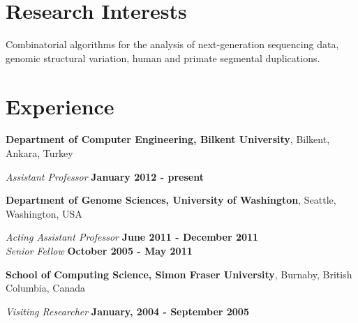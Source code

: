 \documentclass[margin,line]{res}
\newcommand{\junk}[1]{}
\begin{document}
\begin{resume}
  
  \section{\sc Research Interests}
  Combinatorial algorithms for the analysis of next-generation sequencing data, 
  genomic structural variation,  human and primate
  segmental duplications. %

          \section{\sc Experience}
                  {\bf Department of Computer Engineering, Bilkent University},
                  Bilkent, Ankara, Turkey
                  
                  \vspace{-.2cm}
                         {\em Assistant Professor} \hfill {\bf January 2012 - present} 
                         
                         
                         {\bf Department of Genome Sciences, University of Washington},
                         Seattle, Washington, USA
                         
                         \vspace{-.2cm}
                                {\em Acting Assistant Professor} \hfill {\bf June 2011 - December 2011} \\
                                
                                \vspace{-.2cm}
                                       {\em Senior Fellow} \hfill {\bf October 2005 - May 2011}
                                       
                          {\bf School of Computing Science, Simon Fraser University},
                          Burnaby, British Columbia, Canada

                          \vspace{-.2cm}
                                         {\em Visiting Researcher} \hfill {\bf January, 2004 - September 2005}\\
                                         \junk{
                                         Worked on RNA-RNA interaction algorithms, and RNA secondary structure
                                         motif discovery problems, collaborating with Peter Unrau, Kaizhong
                                         Zhang, and Jeremy Buhler.
                                         }
                                       

\end{resume}
\end{document}
